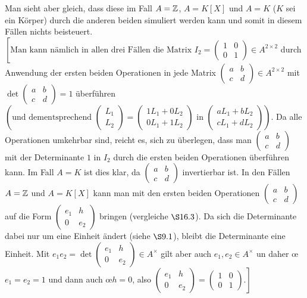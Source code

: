 \documentclass[../../main.tex]{subfiles}
\begin{document}
Man sieht aber gleich, dass diese im Fall $A=\mathbb Z$, $A=K[X]$ und $A=K$ ($K$ sei ein Körper) durch die anderen beiden simuliert werden kann und somit in diesem Fällen nichts beisteuert. $\left[\text{Man kann nämlich in allen drei Fällen die Matrix }I_2=\begin{pmatrix}1&0\\0&1\end{pmatrix}\in A^{2\times 2}\right.$ durch Anwendung der ersten beiden Operationen in jede Matrix $\begin{pmatrix}a&b\\c&d\end{pmatrix}\in A^{2\times 2}$ mit $\det\begin{pmatrix}a&b\\c&d\end{pmatrix}=1$ überführen $\left(\text{und dementsprechend }\begin{pmatrix*}L_1\\L_2\end{pmatrix*}=\begin{pmatrix}1L_1+0L_2\\0L_1+1L_2\end{pmatrix}\text{ in }\begin{pmatrix}aL_1+bL_2\\cL_1+dL_2\end{pmatrix}\right)$. Da alle Operationen umkehrbar sind, reicht es, sich zu überlegen, dass man $\begin{pmatrix}a&b\\c&d\end{pmatrix}$ mit der Determinante $1$ in $I_2$ durch die ersten beiden Operationen überführen kann. Im Fall $A=K$ ist dies klar, da $\begin{pmatrix}a&b\\c&d\end{pmatrix}$ invertierbar ist. In den Fällen $A=\mathbb Z$ und $A=K[X]$ kann man mit den ersten beiden Operationen $\begin{pmatrix}a&b\\c&d\end{pmatrix}$ auf die Form $\begin{pmatrix}e_1&h\\0&e_2\end{pmatrix}$ bringen (vergleiche $\S16.3$). Da sich die Determinante dabei nur um eine Einheit ändert (siehe $\S9.1$), bleibt die Determinante eine Einheit. Mit $e_1e_2=\det \begin{pmatrix}e_1&h\\0&e_2\end{pmatrix}\in A^\times$ gilt aber auch $e_1,e_2\in A^\times$ un daher \oe $e_1=e_2=1$ und dann auch \oe $h=0$, also $\left.\begin{pmatrix}e_1&h\\0&e_2\end{pmatrix}=\begin{pmatrix}1&0\\0&1\end{pmatrix}.\right]$\\
\end{document}
